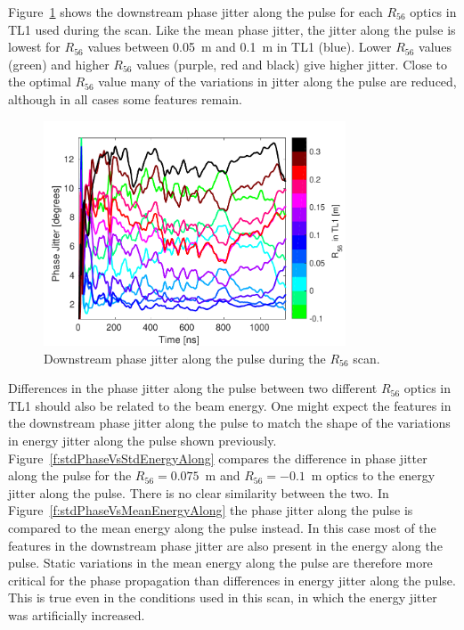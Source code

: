 Figure~\ref{f:R56ScanGunWiggle_JitterAlong} shows the downstream phase jitter along the pulse for each \(R_{56}\) optics in TL1 used during the scan. Like the mean phase jitter, the jitter along the pulse is lowest for \(R_{56}\) values between 0.05~m and 0.1~m in TL1 (blue). Lower \(R_{56}\) values (green) and higher \(R_{56}\) values (purple, red and black) give higher jitter. Close to the optimal \(R_{56}\) value many of the variations in jitter along the pulse are reduced, although in all cases some features remain.

\begin{figure}
  \centering
  \includegraphics[width=0.8\textwidth]{Figures/propagation/R56ScanGunWiggle_JitterAlong}
  \caption{Downstream phase jitter along the pulse during the \(R_{56}\) scan.}
  \label{f:R56ScanGunWiggle_JitterAlong}
\end{figure}

Differences in the phase jitter along the pulse between two different \(R_{56}\) optics in TL1 should also be related to the beam energy. One might expect the features in the downstream phase jitter along the pulse to match the shape of the variations in energy jitter along the pulse shown previously. Figure~\ref{f:stdPhaseVsStdEnergyAlong} compares the difference in phase jitter along the pulse for the \(R_{56} = 0.075\)~m and \(R_{56} = -0.1\)~m optics to the energy jitter along the pulse. There is no clear similarity between the two. In Figure~\ref{f:stdPhaseVsMeanEnergyAlong} the phase jitter along the pulse is compared to the mean energy along the pulse instead. In this case most of the features in the downstream phase jitter are also present in the energy along the pulse. Static variations in the mean energy along the pulse are therefore more critical for the phase propagation than differences in energy jitter along the pulse. This is true even in the conditions used in this scan,  in which the energy jitter was artificially increased.


